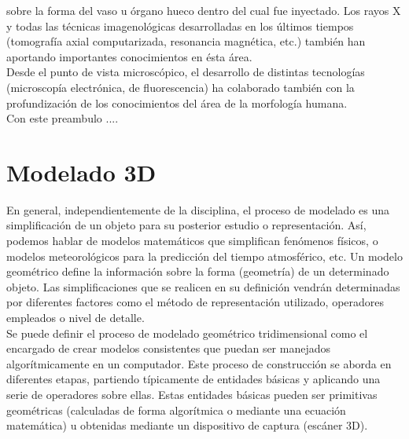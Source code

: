 sobre la forma del vaso u órgano hueco dentro del cual fue inyectado. Los rayos X y todas las técnicas imagenológicas desarrolladas en los últimos tiempos 
(tomografía axial computarizada, resonancia magnética, etc.) también han aportando importantes conocimientos en ésta área.\\
Desde el punto de vista microscópico, el desarrollo de distintas tecnologías (microscopía electrónica, de fluorescencia) ha colaborado también con la profundización de los 
conocimientos del área de la morfología humana.\\
Con este preambulo ....

\section{Modelado 3D}
En general, independientemente de la disciplina, el proceso de modelado es una simplificación de un objeto para su posterior estudio o representación. Así, podemos hablar de modelos matemáticos que simplifican fenómenos físicos, o modelos meteorológicos para la predicción del tiempo atmosférico, etc. Un modelo geométrico define la información sobre la forma (geometría) de un determinado objeto. Las simplificaciones que se realicen en su definición vendrán determinadas por diferentes factores como el método de representación utilizado, operadores empleados o nivel de detalle.\cite{web13} \\

Se puede definir el proceso de modelado geométrico tridimensional como el encargado de crear modelos consistentes que puedan ser manejados algorítmicamente en un computador. Este proceso de construcción se aborda en diferentes etapas, partiendo típicamente de entidades básicas y aplicando una serie de operadores sobre ellas. Estas entidades básicas pueden ser primitivas geométricas (calculadas de forma algorítmica o mediante una ecuación matemática) u obtenidas mediante un dispositivo de captura (escáner 3D).\\

